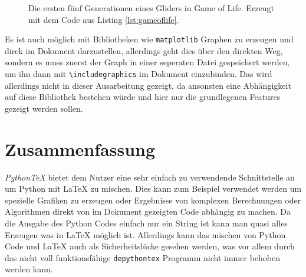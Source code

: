 \documentclass[11pt,a4paper]{article}
\newcommand{\pythontex}{\textit{Python\TeX{}}}
\begin{document}
\begin{figure}[H]
  \centering
  \begin{minipage}{0.19\linewidth}
    \centering
  \end{minipage}
  \begin{minipage}{0.19\linewidth}
    \centering
  \end{minipage}
  \begin{minipage}{0.19\linewidth}
    \centering
  \end{minipage}
  \begin{minipage}{0.19\linewidth}
    \centering
  \end{minipage}
  \begin{minipage}{0.19\linewidth}
    \centering
  \end{minipage}
  \caption{Die ersten fünf Generationen eines Gliders in Game of Life. Erzeugt mit dem Code aus Listing \ref{lst:gameoflife}.}
  \label{fig:gameoflife_glider}
\end{figure}
%
Es ist auch möglich mit Bibliotheken wie \texttt{matplotlib} Graphen zu erzeugen und direk im Dokument darzustellen, allerdings geht dies über den direkten Weg, sondern es muss zuerst der Graph in einer seperaten Datei gespeichert werden, um ihn dann mit \verb#\includegraphics# im Dokument einzubinden.
%
Das wird allerdings nicht in dieser Ausarbeitung gezeigt, da ansonsten eine Abhängigkeit auf diese Bibliothek bestehen würde und hier nur die grundlegenen Features gezeigt werden sollen.

\section{Zusammenfassung}
\pythontex{} bietet dem Nutzer eine sehr einfach zu verwendende Schnittstelle an um Python mit \LaTeX{} zu mischen.
%
Dies kann zum Beispiel verwendet werden um spezielle Grafiken zu erzeugen oder Ergebnisse von komplexen Berechnungen oder Algorithmen direkt von im Dokument gezeigten Code abhängig zu machen.
%
Da die Ausgabe des Python Codes einfach nur ein String ist kann man quasi alles Erzeugen was in \LaTeX{} möglich ist.
%
Allerdings kann das mischen von Python Code und \LaTeX{} auch als Sicherheitslücke gesehen werden, was vor allem durch das nicht voll funktionsfähige \texttt{depythontex} Programm nicht immer behoben werden kann.


\clearpage



\end{document}
